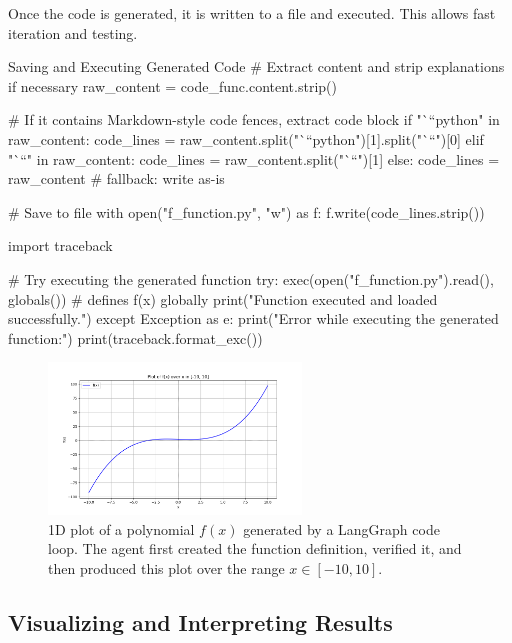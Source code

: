 Once the code is generated, it is written to a file and executed. This allows fast iteration and testing.

\begin{codeonly}{Saving and Executing Generated Code}
# Extract content and strip explanations if necessary
raw_content = code_func.content.strip()

# If it contains Markdown-style code fences, extract code block
if "```python" in raw_content:
    code_lines = raw_content.split("```python")[1].split("```")[0]
elif "```" in raw_content:
    code_lines = raw_content.split("```")[1]
else:
    code_lines = raw_content  # fallback: write as-is

# Save to file
with open("f_function.py", "w") as f:
    f.write(code_lines.strip())

import traceback

# Try executing the generated function
try:
    exec(open("f_function.py").read(), globals())  # defines f(x) globally
    print("Function executed and loaded successfully.")
except Exception as e:
    print("Error while executing the generated function:")
    print(traceback.format_exc())
\end{codeonly}


%
\begin{figure}[h]
\centering
\includegraphics[width=0.6\textwidth]{images/plot1d.png}
\caption{1D plot of a polynomial \( f(x) \) generated by a LangGraph code loop. The agent first created the function definition, verified it, and then produced this plot over the range \( x \in [-10, 10] \).}
\label{fig:langgraph-1d-polynomial}
\end{figure}

%
\subsection*{Visualizing and Interpreting Results}

